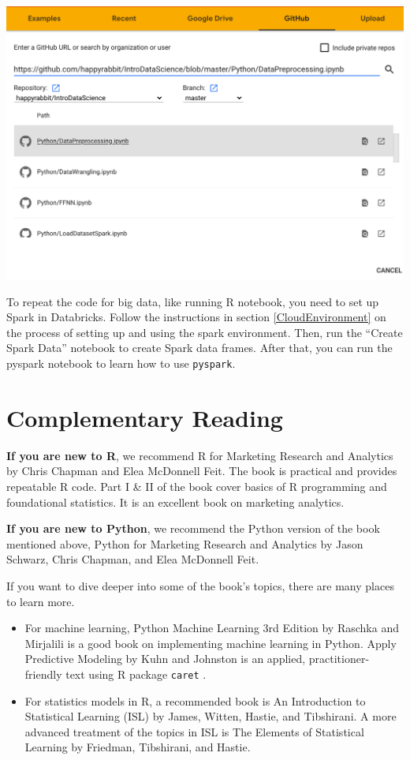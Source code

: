 \documentclass[12pt,]{krantz}
\begin{document}
\begin{center}\includegraphics[width=1\linewidth]{images/loadfromgithub} \end{center}

To repeat the code for big data, like running R notebook, you need to set up Spark in Databricks. Follow the instructions in section \ref{CloudEnvironment} on the process of setting up and using the spark environment. Then, run the ``Create Spark Data'' notebook to create Spark data frames. After that, you can run the pyspark notebook to learn how to use \texttt{pyspark}.

\hypertarget{complementary-reading}{%
\section*{Complementary Reading}\label{complementary-reading}}


\textbf{If you are new to R}, we recommend R for Marketing Research and Analytics by Chris Chapman and Elea McDonnell Feit. The book is practical and provides repeatable R code. Part I \& II of the book cover basics of R programming and foundational statistics. It is an excellent book on marketing analytics.

\textbf{If you are new to Python}, we recommend the Python version of the book mentioned above, Python for Marketing Research and Analytics by Jason Schwarz, Chris Chapman, and Elea McDonnell Feit.

If you want to dive deeper into some of the book's topics, there are many places to learn more.

\begin{itemize}
\item
  For machine learning, Python Machine Learning 3rd Edition by Raschka and Mirjalili is a good book on implementing machine learning in Python. Apply Predictive Modeling by Kuhn and Johnston is an applied, practitioner-friendly text using R package \texttt{caret} .
\item
  For statistics models in R, a recommended book is An Introduction to Statistical Learning (ISL) by James, Witten, Hastie, and Tibshirani. A more advanced treatment of the topics in ISL is The Elements of Statistical Learning by Friedman, Tibshirani, and Hastie.
\end{itemize}
\end{document}

